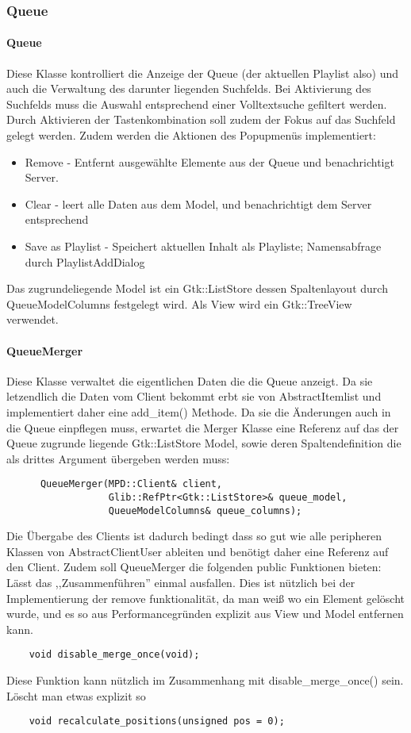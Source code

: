 \subsubsection{Queue}
\paragraph{Queue}
Diese Klasse kontrolliert die Anzeige der Queue (der aktuellen Playlist also) und auch die Verwaltung des darunter liegenden Suchfelds. 
Bei Aktivierung des Suchfelds muss die Auswahl entsprechend einer Volltextsuche gefiltert werden. 
Durch Aktivieren der Tastenkombination soll zudem der Fokus auf das Suchfeld gelegt werden.
Zudem werden die Aktionen des Popupmenüs implementiert:
\begin{itemize}
\item Remove - Entfernt ausgewählte Elemente aus der Queue und benachrichtigt Server.
\item Clear - leert alle Daten aus dem Model, und benachrichtigt dem Server entsprechend
\item Save as Playlist - Speichert aktuellen Inhalt als Playliste; Namensabfrage durch PlaylistAddDialog
\end{itemize}

Das zugrundeliegende Model ist ein Gtk::ListStore dessen Spaltenlayout durch QueueModelColumns festgelegt wird.
Als View wird ein Gtk::TreeView verwendet.

\paragraph{QueueMerger}
Diese Klasse verwaltet die eigentlichen Daten die die Queue anzeigt.
Da sie letzendlich die Daten vom Client bekommt erbt sie von AbstractItemlist
und implementiert daher eine add\_item() Methode. Da sie die Änderungen auch in die Queue einpflegen muss, erwartet die Merger Klasse eine Referenz auf
das der Queue zugrunde liegende Gtk::ListStore Model, sowie deren Spaltendefinition die als drittes Argument übergeben werden muss:
\begin{verbatim}         
      QueueMerger(MPD::Client& client,
                  Glib::RefPtr<Gtk::ListStore>& queue_model,
                  QueueModelColumns& queue_columns);
\end{verbatim}

Die Übergabe des Clients ist dadurch bedingt dass so gut wie alle peripheren Klassen von AbstractClientUser ableiten und benötigt daher eine Referenz auf den Client.
Zudem soll QueueMerger die folgenden public Funktionen bieten:
\\
Lässt das ,,Zusammenführen'' einmal ausfallen. Dies ist nützlich bei der Implementierung der remove funktionalität,
da man weiß wo ein Element gelöscht wurde, und es so aus Performancegründen explizit aus View und Model entfernen kann.
\begin{verbatim}  
    void disable_merge_once(void);
\end{verbatim}
Diese Funktion kann nützlich im Zusammenhang mit disable\_merge\_once() sein. Löscht man etwas explizit so
\begin{verbatim}        
    void recalculate_positions(unsigned pos = 0);
\end{verbatim}    

